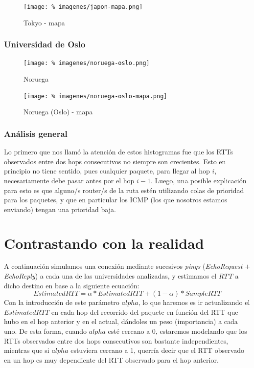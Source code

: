 \documentclass[final,inline,a4paper,narroweqnarray]{ieee}
\let\Oldsection\section
\renewcommand{\section}{\FloatBarrier\Oldsection}
\let\Oldsubsubsection\subsubsection
\renewcommand{\subsubsection}{\FloatBarrier\Oldsubsubsection}
\begin{document}
\begin{figure}[ht]\begin{center}
   \texttt{[image: \%
    imagenes/japon-mapa.png]}
    \caption{Tokyo - mapa}
    \label{Tokyo}
\end{center}\end{figure}

\subsubsection{Universidad de Oslo}
\begin{figure}[ht]\begin{center}
   \texttt{[image: \%
    imagenes/noruega-oslo.png]}
    \caption{Noruega}
    \label{Noruega}
\end{center}\end{figure}

\begin{figure}[ht]\begin{center}
   \texttt{[image: \%
    imagenes/noruega-oslo-mapa.png]}
    \caption{Noruega (Oslo) - mapa}
    \label{Noruega}
\end{center}\end{figure}

\subsubsection{Análisis general}

Lo primero que nos llamó la atención de estos histogramas fue que los RTTs
observados entre dos hops consecutivos no siempre son crecientes. Esto en
principio no tiene sentido, pues cualquier paquete, para llegar al hop $i$,
necesariamente debe pasar antes por el hop $i-1$. Luego, una posible explicación
para esto es que alguno/s router/s de la ruta estén utilizando colas de
prioridad para los paquetes, y que en particular los ICMP (los que nosotros
estamos enviando) tengan una prioridad baja.

\section{Contrastando con la realidad}
A continuación simulamos una conexión mediante sucesivos \emph{pings}
(\emph{EchoRequest} $+$ \emph{EchoReply}) a cada una de las universidades
analizadas, y estimamos el \emph{RTT} a dicho destino en base a la siguiente
ecuación:
\[
EstimatedRTT = \alpha * EstimatedRTT + (1 - \alpha) * SampleRTT
\]
Con la introducción de este parámetro $alpha$, lo que haremos es ir actualizando
el $EstimatedRTT$ en cada hop del recorrido del paquete en función del RTT que
hubo en el hop anterior y en el actual, dándoles un peso (importancia) a cada
uno. De esta forma, cuando $alpha$ esté cercano a 0, estaremos modelando que los
RTTs observados entre dos hops consecutivos son bastante independientes,
mientras que si $alpha$ estuviera cercano a 1, querría decir que el RTT
observado en un hop es muy dependiente del RTT observado para el hop anterior.
\end{document}
